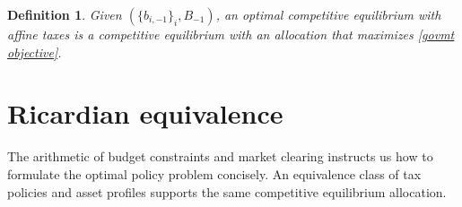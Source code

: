 \documentclass[thmsb,11pt]{article}
\newtheorem{definition}{Definition}
\begin{document}
\begin{definition}
\label{Def: optimal CE affine} Given $(\{b_{i,-1}\}_{i},B_{-1})$, an optimal
competitive equilibrium with affine taxes is a competitive equilibrium with an allocation that maximizes \eqref{govmt objective}.
\end{definition}
%
%
%
%

\color{black}

\section{Ricardian equivalence \label{sec:Ricardian101}}
The arithmetic of budget constraints and market clearing instructs us how to  formulate the optimal policy problem concisely.
An equivalence class of tax policies and asset profiles supports the same competitive equilibrium allocation.
\end{document}
